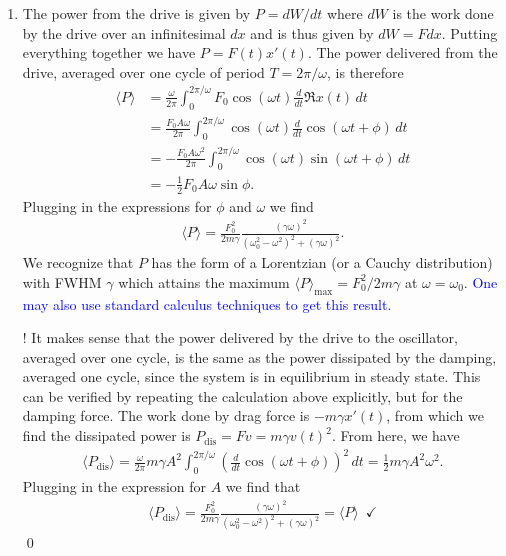 \documentclass{article}
\theoremstyle{definition}
\newcommand{\f}[2]{\frac{#1}{#2}}
\newcommand{\lp}{\left(}
\newcommand{\rp}{\right)}
\begin{document}
\begin{enumerate}[label= \alph*)]
\begin{enumerate}[label=\roman*)]
	
	\item The power from the drive is given by $P = dW/dt$ where $dW$ is the work done by the drive over an infinitesimal $dx$ and is thus given by $dW = Fdx$.  Putting everything together we have $P = F(t)x'(t)$. The power delivered from the drive, averaged over one cycle of period $T = 2\pi / \omega$, is therefore
	\begin{align*}
	\langle P \rangle 
	&= \f{\omega}{2\pi}\int_{0}^{2\pi/\omega} F_0 \cos(\omega t) \f{d}{dt} \Re{x(t)} \,dt \\
	&= \f{F_0 A \omega}{2\pi}  \int_{0}^{2\pi/\omega} \cos(\omega t)  \f{d}{dt} \cos\lp \omega t + \phi \rp \,dt \\
	&= -\f{F_0 A \omega^2}{2\pi}  \int_{0}^{2\pi/\omega} \cos(\omega t) \sin\lp \omega t + \phi \rp \,dt \\
	&= -\f{1}{2}F_0 A \omega \sin \phi.
	\end{align*} 
	Plugging in the expressions for $\phi$ and $\omega$ we find 
	\begin{align*}
	\langle P \rangle = \f{F_0^2 }{2m\gamma}\f{(\gamma\omega)^2}{(\omega_0^2 - \omega^2)^2 + (\gamma \omega)^2}.
	\end{align*}
	We recognize that $P$ has the form of a Lorentzian (or a Cauchy distribution) with FWHM $\gamma$ which attains the maximum $\langle P \rangle_\text{max} = F_0^2/2m\gamma$ at $\omega = \omega_0$.  \textcolor{blue}{One may also use standard calculus techniques to get this result.}
	
	
	$\boxed{\textbf{!}}$ It makes sense that the power delivered by the drive to the oscillator, averaged over one cycle, is the same as the power dissipated by the damping, averaged one cycle, since the system is in equilibrium in steady state. This can be verified by repeating the calculation above explicitly, but for the damping force. The work done by drag force is $-m\gamma x'(t)$, from which we find the dissipated power is $P_\text{dis} = Fv = m\gamma v(t)^2$. From here, we have
	\begin{align*}
	\langle P_\text{dis}\rangle = \f{\omega}{2\pi}m\gamma A^2\int_0^{2\pi/\omega} \lp \f{d}{dt}\cos(\omega t + \phi)\rp^2\,dt = \f{1}{2}m\gamma A^2\omega^2.
	\end{align*}
	Plugging in the expression for $A$ we find that
	\begin{align*}
	\langle P_\text{dis}\rangle = \f{F_0^2}{2m\gamma} \f{(\gamma\omega)^2}{(\omega_0^2 - \omega^2)^2 + (\gamma \omega)^2} = \langle P \rangle \,\,\,\checkmark
	\end{align*}
	\qed
	

\end{enumerate}
\end{enumerate}
\end{document}
